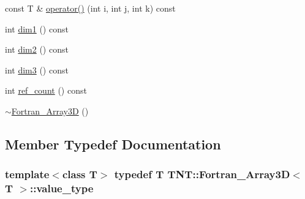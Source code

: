 \begin{DoxyCompactItemize}
const T \& \hyperlink{classTNT_1_1Fortran__Array3D_a6cbbf08eb4a6d239d3619b9638e1cfef}{operator()} (int i, int j, int k) const 
\item 
int \hyperlink{classTNT_1_1Fortran__Array3D_aa62f27f83a69aeca3d0a5ae3f0764b88}{dim1} () const 
\item 
int \hyperlink{classTNT_1_1Fortran__Array3D_a5ce0e45055a4d25f5aef1e4fa5eacedb}{dim2} () const 
\item 
int \hyperlink{classTNT_1_1Fortran__Array3D_a22f590674157b6af894ff0716fa59f72}{dim3} () const 
\item 
int \hyperlink{classTNT_1_1Fortran__Array3D_a617160d317ab52acb71aa51601894f78}{ref\-\_\-count} () const 
\item 
\hyperlink{classTNT_1_1Fortran__Array3D_a9164c5369ef7b82b3c280dc9704527d9}{$\sim$\-Fortran\-\_\-\-Array3\-D} ()
\end{DoxyCompactItemize}


\subsection{Member Typedef Documentation}
\hypertarget{classTNT_1_1Fortran__Array3D_ac63354327521c0974bb45a9b02a9ff40}{
\subsubsection[{value\-\_\-type}]{\setlength{\rightskip}{0pt plus 5cm}template$<$class T$>$ typedef T {\bf T\-N\-T\-::\-Fortran\-\_\-\-Array3\-D}$<$ T $>$\-::{\bf value\-\_\-type}}}\label{classTNT_1_1Fortran__Array3D_ac63354327521c0974bb45a9b02a9ff40}



